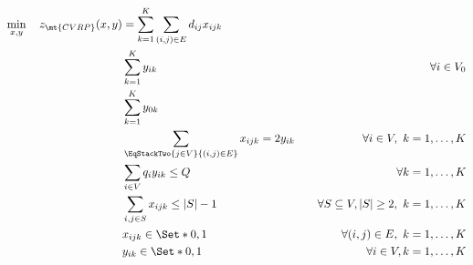 \begin{align}
	\min_{x, y} \quad z_\mt{CVRP}(x, y) & =  \sum_{k = 1}^K \sum_{(i, j) \in E} d_{ij} x_{ijk} \label{eq:three-index-flow-obj-func}                                                                                                                          \\
	                                    & \sum_{k = 1}^K y_{ik}                                                                     & \quad \forall i \in V_0                                              \label{eq:three-index-flow-all-customers-visited} \\
	                                    & \sum_{k = 1}^K y_{0k}                                                                     & \label{eq:three-index-flow-tour-starts-and-ends-at-depot}                                                              \\
	                                    & \sum_{\EqStackTwo{j \in V}{(i, j) \in E}} x_{ijk} = 2 y_{ik}                              & \quad \forall i \in V,\ k = 1, \dots, K \label{eq:three-index-flow-force-visited-customer-if-flow}                     \\
	                                    & \sum_{i \in V} q_i y_{ik} \le Q                                                           & \quad \forall k = 1, \dots, K \label{eq:three-index-flow-force-resource-upper-bound}                                   \\
	                                    & \sum_{i, j \in S} x_{ijk} \le |S| - 1                                                     & \quad \forall S \subseteq V, |S| \ge 2,\ k = 1, \dots, K \label{eq:three-index-flow-secs}                              \\
	                                    & x_{ijk}                   \in \Set*{0, 1}                                                 & \quad \forall (i, j) \in E,\ k = 1, \dots, K             \label{eq:three-index-flow-x-mip-var-bounds}                  \\
	                                    & y_{ik}                    \in \Set*{0, 1}                                                 & \quad \forall i \in V,k = 1, \dots, K  \label{eq:three-index-flow-y-mip-var-bounds}
\end{align}

